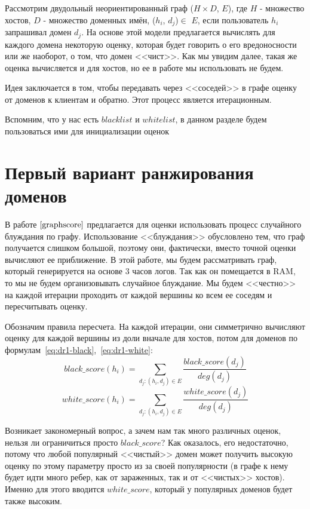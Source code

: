 \documentclass[a4paper,14pt]{extreport} %
\begin{document}
Рассмотрим двудольный неориентированный граф ($H\times D$, $E$), где $H$ - множество хостов, $D$ - множество доменных имён, ($h_i$, $d_j$)$\in$ $E$, если пользователь $h_i$ запрашивал домен $d_j$. 
На основе этой модели предлагается вычислять для каждого домена некоторую оценку, которая будет говорить о его вредоносности или же наоборот, о том, что домен <<чист>>. Как мы увидим далее, такая же оценка вычисляется и для хостов, но ее в работе мы использовать не будем.

Идея заключается в том, чтобы передавать через <<соседей>> в графе оценку от доменов к клиентам и обратно. Этот процесс является итерационным.
	
			
Вспомним, что у нас есть $blacklist$ и $whitelist$, в данном разделе будем пользоваться ими для инициализации оценок

\section{Первый вариант ранжирования доменов}
В работе $\cite{graphscore}$ предлагается для оценки использовать процесс случайного блуждания по графу. Использование <<блуждания>> обусловлено тем, что граф получается слишком большой, поэтому они, фактически, вместо точной оценки вычисляют ее приближение. В этой работе, мы будем рассматривать граф, который генерируется на основе 3 часов логов. Так как он помещается в RAM, то мы не будем организовывать случайное блуждание. Мы будем <<честно>> на каждой итерации проходить от каждой вершины ко всем ее соседям и пересчитывать оценку.

Обозначим правила пересчета. На каждой итерации, они симметрично вычисляют оценку для каждой вершины из доли вначале для хостов, потом для доменов по формулам~\ref{eq:dr1-black},~\ref{eq:dr1-white}:
\begin{equation}
	\label{eq:dr1-black}
	black\_score(h_i) = \sum_{d_j: (h_i, d_j)\in E} \frac{black\_score(d_j)}{deg(d_j)}
\end{equation}
\begin{equation}
	\label{eq:dr1-white}
	white\_score(h_i) = \sum_{d_j: (h_i, d_j)\in E} \frac{white\_score(d_j)}{deg(d_j)}
\end{equation}
	
Возникает закономерный вопрос, а зачем нам так много различных оценок, нельзя ли ограничиться просто $black\_score$? Как оказалось, его недостаточно, потому что любой популярный <<чистый>> домен может получить высокую оценку по этому параметру просто из за своей популярности (в графе к нему будет идти много ребер, как от зараженных, так и от <<чистых>> хостов). Именно для этого вводится $white\_score$, который у популярных доменов будет также высоким.
	
\end{document}
